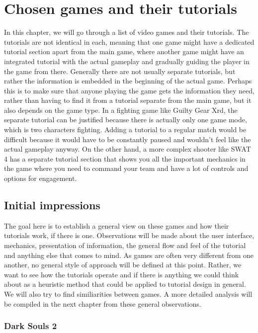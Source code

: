 \chapter{Chosen games and their tutorials}

In this chapter, we will go through a list of video games and their tutorials. The tutorials are not identical in each, meaning that one game might have a dedicated tutorial section apart from the main game, where another game might have an integrated tutorial with the actual gameplay and gradually guiding the player in the game from there. Generally there are not usually separate tutorials, but rather the information is embedded in the beginning of the actual game. Perhaps this is to make sure that anyone playing the game gets the information they need, rather than having to find it from a tutorial separate from the main game, but it also depends on the game type. In a fighting game like Guilty Gear Xrd, the separate tutorial can be justified because there is actually only one game mode, which is two characters fighting. Adding a tutorial to a regular match would be difficult because it would have to be constantly paused and wouldn't feel like the actual gameplay anyway. On the other hand, a more complex shooter like SWAT 4 has a separate tutorial section that shows you all the important mechanics in the game where you need to command your team and have a lot of controls and options for engagement.
\section{Initial impressions}

The goal here is to establish a general view on these games and how their tutorials work, if there is one. Observations will be made about the user interface, mechanics, presentation of information, the general flow and feel of the tutorial and anything else that comes to mind. As games are often very different from one another, no general style of approach will be defined at this point. Rather, we want to see how the tutorials operate and if there is anything we could think about as a heuristic method that could be applied to tutorial design in general. We will also try to find similiarities between games. A more detailed analysis will be compiled in the next chapter from these general observations. 

\subsection{Dark Souls 2}
